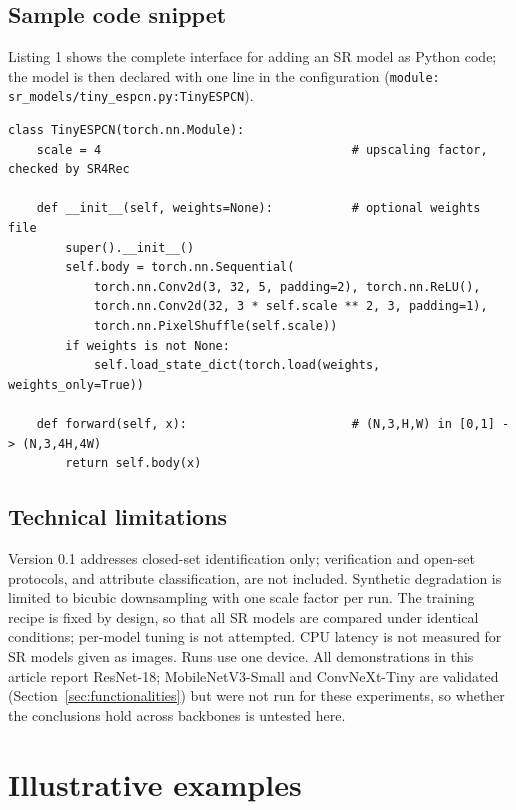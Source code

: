 \documentclass[preprint,12pt]{elsarticle}
\begin{document}
\subsection{Sample code snippet}
\label{sec:snippet}

Listing 1 shows the complete interface for adding an SR model as Python code; the
model is then declared with one line in the configuration
(\texttt{module: sr\_models/tiny\_espcn.py:TinyESPCN}).

\newpage
\begin{lstlisting}[caption={An SR model added as a Python class (method 2).
SR4Rec verifies the class, the scale and the output shape before use.},
label=lst:module]
class TinyESPCN(torch.nn.Module):
    scale = 4                                   # upscaling factor, checked by SR4Rec

    def __init__(self, weights=None):           # optional weights file
        super().__init__()
        self.body = torch.nn.Sequential(
            torch.nn.Conv2d(3, 32, 5, padding=2), torch.nn.ReLU(),
            torch.nn.Conv2d(32, 3 * self.scale ** 2, 3, padding=1),
            torch.nn.PixelShuffle(self.scale))
        if weights is not None:
            self.load_state_dict(torch.load(weights, weights_only=True))

    def forward(self, x):                       # (N,3,H,W) in [0,1] -> (N,3,4H,4W)
        return self.body(x)
\end{lstlisting}

\subsection{Technical limitations}
\label{sec:limitations}

Version 0.1 addresses closed-set identification only; verification and open-set protocols, and
attribute classification, are not included. Synthetic degradation is limited to bicubic
downsampling with one scale factor per run. The training recipe is fixed by design, so that all SR models are compared under identical
conditions; per-model tuning is not attempted. CPU latency is not measured for SR models given as images. Runs use one
device. All demonstrations in this article report ResNet-18; MobileNetV3-Small and ConvNeXt-Tiny
are validated (Section~\ref{sec:functionalities}) but were not run for these experiments, so
whether the conclusions hold across backbones is untested here.

\section{Illustrative examples}
\label{sec:examples}
\end{document}
